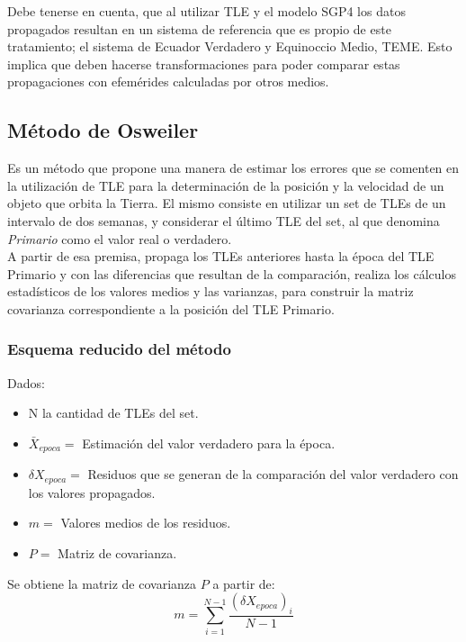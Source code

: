 Debe tenerse en cuenta, que al utilizar TLE y el modelo SGP4  los datos propagados resultan en un sistema de referencia que es propio de este tratamiento; el sistema de Ecuador Verdadero y Equinoccio Medio, \ac{TEME}. Esto implica que deben hacerse transformaciones para poder comparar estas propagaciones con efem\'erides calculadas por otros medios.\\

\subsection{M\'etodo de Osweiler}\label{subsec:osw}
Es un m\'etodo que propone una manera de estimar los errores que se comenten en la utilizaci\'on de TLE para la determinaci\'on de la posici\'on y la velocidad de un objeto que orbita la Tierra.
El mismo consiste en utilizar un set de TLEs de un intervalo de dos semanas, y considerar el \'ultimo TLE del set, al que denomina {\it{Primario}} como el valor real o verdadero.\\
A partir de esa premisa, propaga los TLEs anteriores hasta la \'epoca del TLE Primario y con las diferencias que resultan de la comparaci\'on, realiza los c\'alculos estad\'isticos de los valores medios y las varianzas, para construir la matriz covarianza correspondiente a la posici\'on del TLE Primario.\\

\subsubsection*{Esquema reducido del m\'etodo}

Dados:
\begin{itemize}
\itemsep0em
 \item N la cantidad de TLEs del set.
 \item $\bar{X}_{epoca} = $  Estimaci\'on del valor verdadero para la \'epoca.
 \item $\delta X_{epoca} = $ Residuos que se generan de la comparaci\'on del valor verdadero con los valores propagados.
 \item $m = $ Valores medios de los residuos.
 \item $P = $ Matriz de covarianza.
\end{itemize}

Se obtiene la matriz de covarianza $P$ a partir de:\\

\begin{equation}
 m=\sum_{i=1}^{N-1} \frac{(\delta X_{epoca})_{i}}{N-1} 
\end{equation}

